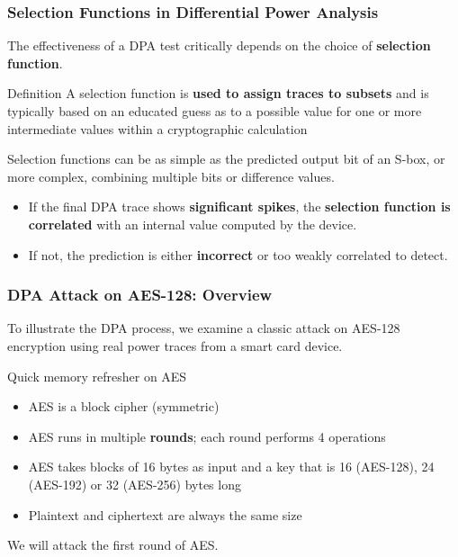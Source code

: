 \begin{frame}
    \frametitle{Selection Functions in Differential Power Analysis}

    The effectiveness of a DPA test critically depends on the choice of \textbf{selection function}.

    \begin{block}{Definition}
        A selection function is \textbf{used to assign traces to subsets} and is typically based on an educated guess as to a possible value for one or more intermediate values within a cryptographic calculation
    \end{block}
    Selection functions can be as simple as the predicted output bit of an S-box, or more complex, combining multiple bits or difference values.
    \begin{alertblock}{}
    \begin{itemize}
    \item If the final DPA trace shows \textbf{significant spikes}, the \textbf{selection function is correlated} with an internal value computed by the device.
        \item If not, the prediction is either \textbf{incorrect} or too weakly correlated to detect.
        \end{itemize}
    \end{alertblock}
\end{frame}


\begin{frame}
    \frametitle{DPA Attack on AES-128: Overview}

    To illustrate the DPA process, we examine a classic attack on AES-128 encryption using real power traces from a smart card device. \newline
    \begin{block}{Quick memory refresher on AES}
        \begin{itemize}
            \item AES is a block cipher (symmetric)
            \item AES runs in multiple \textbf{rounds}; each round performs 4 operations
            \item AES takes blocks of 16 bytes as input and a key that is 16 (AES-128), 24 (AES-192) or 32 (AES-256) bytes long 
            \item Plaintext and ciphertext are always the same size
        \end{itemize}
    \end{block}
    We will attack the first round of AES.
\end{frame}

